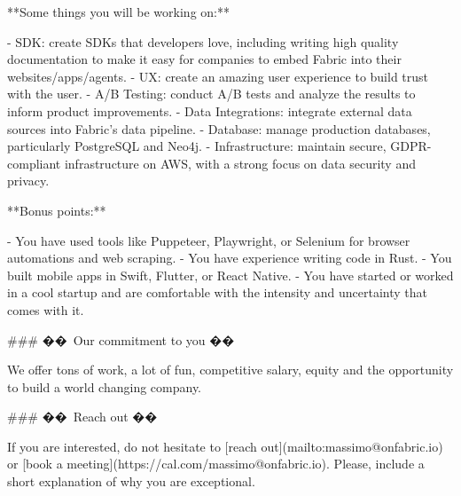 **Some things you will be working on:**

- SDK: create SDKs that developers love, including writing high quality documentation to make it easy for companies to embed Fabric into their websites/apps/agents.
- UX: create an amazing user experience to build trust with the user.
- A/B Testing: conduct A/B tests and analyze the results to inform product improvements.
- Data Integrations: integrate external data sources into Fabric’s data pipeline.
- Database: manage production databases, particularly PostgreSQL and Neo4j.
- Infrastructure: maintain secure, GDPR-compliant infrastructure on AWS, with a strong focus on data security and privacy.

**Bonus points:**

- You have used tools like Puppeteer, Playwright, or Selenium for browser automations and web scraping.
- You have experience writing code in Rust.
- You built mobile apps in Swift, Flutter, or React Native.
- You have started or worked in a cool startup and are comfortable with the intensity and uncertainty that comes with it.

### �� Our commitment to you ��

We offer tons of work, a lot of fun, competitive salary, equity and the opportunity to build a world changing company.

### �� Reach out ��

If you are interested, do not hesitate to [reach out](mailto:massimo@onfabric.io) or [book a meeting](https://cal.com/massimo@onfabric.io). Please, include a short explanation of why you are exceptional.